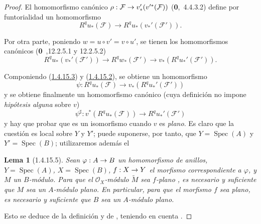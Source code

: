 \documentclass[10pt,oneside,openany]{book}
\theoremstyle{egaenv}\newtheorem*{env}{---}
\theoremstyle{egastatement}
\newtheorem*{lemma}{Lema}
\theoremstyle{egadescription}
\newcommand{\oldpage}[2][]{\marginnote{\normalfont\scriptsize\textbf{#1}\,|\,#2}\ignorespaces}
\renewcommand{\to}{\mathchoice{\longrightarrow}{\rightarrow}{\rightarrow}{\rightarrow}}
\begin{document}
\oldpage[III]{93}
\begin{proof}
El homomorfismo canónico
$\rho:\mathcal F\to v_*'(v'^*(\mathcal F))$ (\textbf{0},~4.4.3.2) define por funtorialidad un homomorfismo
\begin{equation}
\label{III.1.4.15.2-fr}
\tag{1.4.15.2}
R^qu_*(\mathcal F)\longrightarrow R^qu_*(v_*'(\mathcal F')).
\end{equation}

Por otra parte, poniendo $w=u\circ v'=v\circ u'$, se tienen los homomorfismos canónicos (\textbf{0}~,12.2.5.1 y 12.2.5.2)
\begin{equation}
\label{III.1.4.15.3-fr}
\tag{1.4.15.3}
R^qu_*(v_*'(\mathcal F'))\longrightarrow R^qw_*(\mathcal F')
\longrightarrow v_*(R^qu_*'(\mathcal F')).
\end{equation}

Componiendo (\hyperref[III.1.4.15.3]{1.4.15.3}) y (\hyperref[III.1.4.15.2]{1.4.15.2}), se obtiene un homomorfismo
\[
\psi:R^qu_*(\mathcal F)\longrightarrow v_*(R^qu_*'(\mathcal F'))
\]
y se obtiene finalmente un homomorfismo canónico (cuya definición no impone \emph{hipótesis alguna} sobre $v$)
\begin{equation}
\label{III.1.4.15.4-fr}
\tag{1.4.15.4}
\psi^\sharp:v^*(R^qu_*(\mathcal F))\longrightarrow R^qu_*'(\mathcal F')
\end{equation}
y hay que probar que es un isomorfismo cuando $v$ es \emph{plano}.
Es claro que la cuestión es local sobre $Y$ y $Y'$; puede suponerse, por tanto, que $Y=\operatorname{Spec}(A)$ y $Y'=\operatorname{Spec}(B)$; utilizaremos además el
\begin{lemma}[1.4.15.5]
\label{III.1.4.15.5-fr}
Sean $\varphi:A\to B$ un homomorfismo de anillos, $Y=\operatorname{Spec}(A)$, $X=\operatorname{Spec}(B)$, $f:X\to Y$ el morfismo correspondiente a $\varphi$, y $M$ un $B$-módulo.
Para que el $\mathcal O_X$-módulo $\widetilde M$ sea $f$-plano , es necesario y suficiente que $M$ sea un $A$-módulo plano.
En particular, para que el morfismo $f$ sea plano, es necesario y suficiente que $B$ sea un $A$-módulo plano.
\end{lemma}

Esto se deduce de la definición  y de , teniendo en cuenta .


\end{proof}
\end{document}
